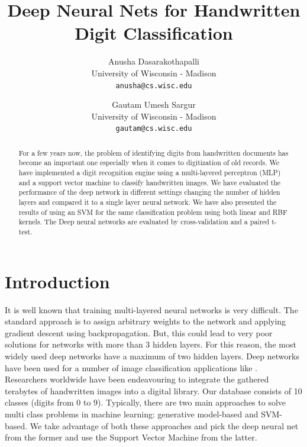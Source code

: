 \documentclass[10pt,twocolumn,letterpaper]{article}
\begin{document}
\title{Deep Neural Nets for Handwritten Digit Classification}

\author{Anusha Dasarakothapalli\\
University of Wisconsin - Madison\\
{\tt\small anusha@cs.wisc.edu}
\and
Gautam Umesh Sargur\\
University of Wisconsin - Madison\\
{\tt\small gautam@cs.wisc.edu}
}

\maketitle
\thispagestyle{empty}
\begin{abstract}
   For a few years now, the problem of identifying digits from handwritten documents has become an important one especially when it comes to digitization of old records. We have implemented a digit recognition engine using a multi-layered perceptron (MLP) and a support vector machine to classify handwritten images. We have evaluated the performance of the deep network in different settings changing the number of hidden layers and compared it to a single layer neural network. We have also presented the results of using an SVM for the same classification problem using both linear and RBF kernels. The Deep neural networks are evaluated by cross-validation and a paired t-test.
\end{abstract}

\section{Introduction}

It is well known that training multi-layered neural networks is very difficult. The standard approach is to assign arbitrary weights to the network and applying gradient descent using backpropagation. But, this could lead to very poor solutions for networks with more than 3 hidden layers. For this reason, the most widely used deep networks have a maximum of two hidden layers. Deep networks have been used for a number of image classification applications like \cite{Schmidhuber:2012:MDN:2354409.2354694}.\\

Researchers worldwide have been endeavouring to integrate the gathered terabytes of handwritten images into a digital library. Our database consists of 10 classes (digits from 0 to 9). Typically, there are two main approaches to solve multi class problems in machine learning: generative model-based and SVM-based. We take advantage of both these approaches and pick the deep neural net from the former and use the Support Vector Machine from the latter.\\
\end{document}
